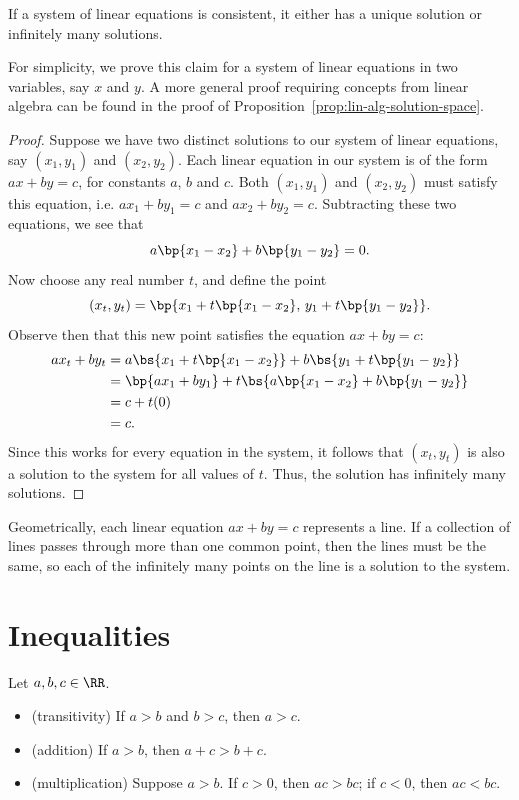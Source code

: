 \begin{proposition}
    If a system of linear equations is consistent, it either has a unique solution or infinitely many solutions.
\end{proposition}
For simplicity, we prove this claim for a system of linear equations in two variables, say $x$ and $y$. A more general proof requiring concepts from linear algebra can be found in the proof of Proposition~\ref{prop:lin-alg-solution-space}.
\begin{proof}
    Suppose we have two distinct solutions to our system of linear equations, say $(x_1, y_1)$ and $(x_2, y_2)$. Each linear equation in our system is of the form $ax + by = c$, for constants $a$, $b$ and $c$. Both $(x_1, y_1)$ and $(x_2, y_2)$ must satisfy this equation, i.e. $ax_1 + by_1 = c$ and $ax_2 + by_2 = c$. Subtracting these two equations, we see that \[a\bp{x_1 - x_2} + b\bp{y_1 - y_2} = 0.\] Now choose any real number $t$, and define the point \[(x_t, y_t) = \bp{x_1 + t\bp{x_1 - x_2}, \, y_1 + t\bp{y_1 - y_2}}.\] Observe then that this new point satisfies the equation $ax + by = c$:
    \begin{align*}
        ax_t + by_t &= a\bs{x_1 + t\bp{x_1 - x_2}} + b\bs{y_1 + t\bp{y_1 - y_2}}\\
        &= \bp{ax_1 + by_1} + t\bs{a\bp{x_1 - x_2} + b\bp{y_1 - y_2}}\\
        &= c + t(0)\\
        &= c.
    \end{align*}
    Since this works for every equation in the system, it follows that $(x_t, y_t)$ is also a solution to the system for all values of $t$. Thus, the solution has infinitely many solutions.
\end{proof}

Geometrically, each linear equation $ax + by = c$ represents a line. If a collection of lines passes through more than one common point, then the lines must be the same, so each of the infinitely many points on the line is a solution to the system.

\section{Inequalities}

\begin{fact}
    Let $a, b, c \in \RR$.
    \begin{itemize}
        \item (transitivity) If $a > b$ and $b > c$, then $a > c$.
        \item (addition) If $a > b$, then $a + c > b + c$.
        \item (multiplication) Suppose $a > b$. If $c > 0$, then $ac > bc$; if $c < 0$, then $ac < bc$.
    \end{itemize}
\end{fact}

